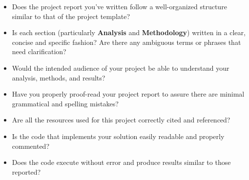 \documentclass[12pt]{article}
\begin{document}
\begin{itemize}
\item
  Does the project report you've written follow a well-organized
  structure similar to that of the project template?
\item
  Is each section (particularly \textbf{Analysis} and
  \textbf{Methodology}) written in a clear, concise and specific
  fashion? Are there any ambiguous terms or phrases that need
  clarification?
\item
  Would the intended audience of your project be able to understand your
  analysis, methods, and results?
\item
  Have you properly proof-read your project report to assure there are
  minimal grammatical and spelling mistakes?
\item
  Are all the resources used for this project correctly cited and
  referenced?
\item
  Is the code that implements your solution easily readable and properly
  commented?
\item
  Does the code execute without error and produce results similar to
  those reported?
\end{itemize}

\printbibliography
   
\end{document}
